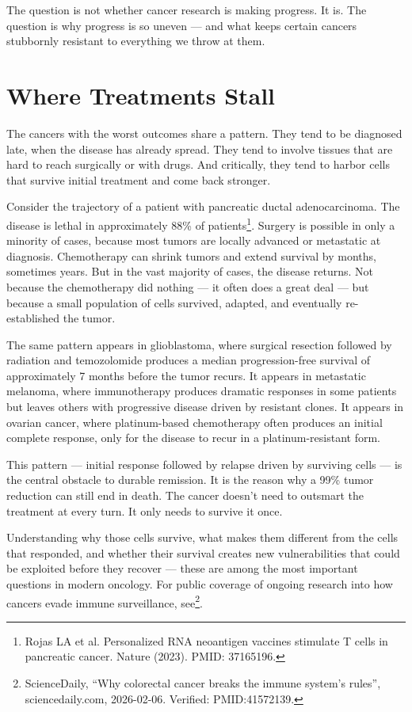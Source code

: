 \documentclass[11pt,twoside,openright]{report}
\begin{document}
The question is not whether cancer research is making progress. It is. The question is why progress is so uneven --- and what keeps certain cancers stubbornly resistant to everything we throw at them.

\section{Where Treatments Stall}

The cancers with the worst outcomes share a pattern. They tend to be diagnosed late, when the disease has already spread. They tend to involve tissues that are hard to reach surgically or with drugs. And critically, they tend to harbor cells that survive initial treatment and come back stronger.

Consider the trajectory of a patient with pancreatic ductal adenocarcinoma. The disease is lethal in approximately 88\% of patients\footnote{Rojas LA et al. Personalized RNA neoantigen vaccines stimulate T cells in pancreatic cancer. Nature (2023). PMID: 37165196.}. Surgery is possible in only a minority of cases, because most tumors are locally advanced or metastatic at diagnosis. Chemotherapy can shrink tumors and extend survival by months, sometimes years. But in the vast majority of cases, the disease returns. Not because the chemotherapy did nothing --- it often does a great deal --- but because a small population of cells survived, adapted, and eventually re-established the tumor.

The same pattern appears in glioblastoma, where surgical resection followed by radiation and temozolomide produces a median progression-free survival of approximately 7 months before the tumor recurs. It appears in metastatic melanoma, where immunotherapy produces dramatic responses in some patients but leaves others with progressive disease driven by resistant clones. It appears in ovarian cancer, where platinum-based chemotherapy often produces an initial complete response, only for the disease to recur in a platinum-resistant form.

This pattern --- initial response followed by relapse driven by surviving cells --- is the central obstacle to durable remission. It is the reason why a 99\% tumor reduction can still end in death. The cancer doesn't need to outsmart the treatment at every turn. It only needs to survive it once.

Understanding why those cells survive, what makes them different from the cells that responded, and whether their survival creates new vulnerabilities that could be exploited before they recover --- these are among the most important questions in modern oncology. For public coverage of ongoing research into how cancers evade immune surveillance, see\footnote{ScienceDaily, ``Why colorectal cancer breaks the immune system's rules'', sciencedaily.com, 2026-02-06. Verified: PMID:41572139.}.
\end{document}
